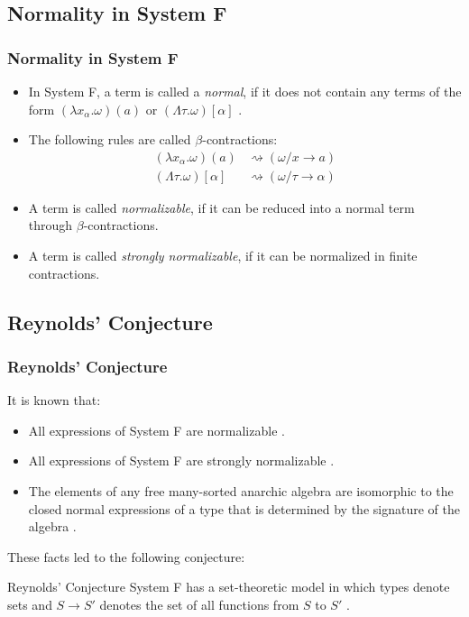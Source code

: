 \subsection{Normality in System F}

\begin{frame}[fragile]
    \frametitle{Normality in System F}
  
    \begin{itemize}
        \item In System F, a term is called a \textit{normal}, if it does not contain any terms of the form $(\lambda x_\alpha. \omega)(a)$ or $(\Lambda \tau. \omega)[\alpha]$  \cite{capretta_valentini_1999}.
        \item The following rules are called $\beta$-contractions:
        \begin{align*}
            (\lambda x_\alpha. \omega)(a) &\rightsquigarrow (\omega / x \rightarrow a) \\
            (\Lambda \tau. \omega)[\alpha] &\rightsquigarrow (\omega / \tau \rightarrow \alpha)
        \end{align*}
        \item A term is called \textit{normalizable}, if it can be reduced into a normal term through $\beta$-contractions.
        \item A term is called \textit{strongly normalizable}, if it can be normalized in finite contractions.
    \end{itemize}
\end{frame}

\subsection{Reynolds' Conjecture}

\begin{frame}[fragile]
    \frametitle{Reynolds' Conjecture}
  
    It is known that:
    \begin{itemize}
        \item All expressions of System F are normalizable \cite{girard1972phd}.
        \item All expressions of System F are strongly normalizable \cite{PRAWITZ1971235}.
        \item The elements of any free many-sorted anarchic algebra are isomorphic to the closed normal expressions of a type that is determined by the signature of the algebra \cite{BOHM1985135}.
    \end{itemize}

    These facts led to the following conjecture:
    \begin{block}{Reynolds' Conjecture}
		System F has a set-theoretic model in which types denote sets and $S \rightarrow S'$ denotes the set of all functions from $S$ to $S'$ \cite{reynolds1983types}.
	\end{block}
\end{frame}

